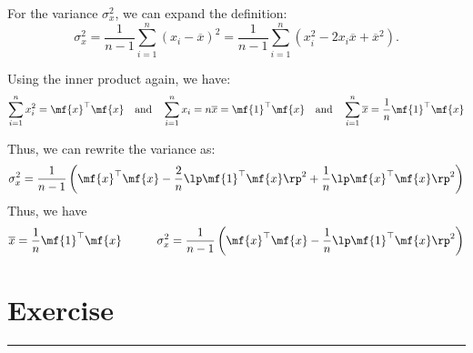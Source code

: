 \begin{enumerate}
\begin{boxedstuff}
        For the variance \( \sigma_x^2 \), we can expand the definition:
        \[
        \sigma_x^2 = \frac{1}{n-1} \sum_{i=1}^n (x_i - \overline{x})^2 = \frac{1}{n-1} \sum_{i=1}^n \left( x_i^2 - 2x_i\overline{x} + \overline{x}^2 \right).
        \]

        Using the inner product again, we have:
        \[
        \sum_{i=1}^n x_i^2 = \mf{x}^\top\mf{x} \quad \text{and} \quad 
        \sum_{i=1}^n x_i = n\overline{x} = \mf{1}^\top\mf{x} \quad \text{and} \quad \sum_{i=1}^n \overline{x} = \frac{1}{n}\mf{1}^\top\mf{x}
        \]

        Thus, we can rewrite the variance as:
        \[
        \sigma_x^2 = \frac{1}{n-1} \left( \mf{x}^\top\mf{x} - \frac{2}{n}\lp \mf{1}^\top \mf{x} \rp^2 + \frac{1}{n}\lp \mf{x}^\top\mf{x} \rp^2 \right)
        \]
        Thus, we have
        \[
        \overline{x} = \frac{1}{n}\mf{1}^\top \mf{x} \quad \quad \quad 
        \sigma_x^2 = \frac{1}{n-1} \left( \mf{x}^\top\mf{x} - \frac{1}{n} \lp \mf{1}^\top\mf{x} \rp^2 \right)
        \]
    \end{boxedstuff}

\end{enumerate}
\newpage

\section{Exercise}
\vspace{-0.5cm}
\begin{center}
    \rule{\textwidth}{1pt}
\end{center}

